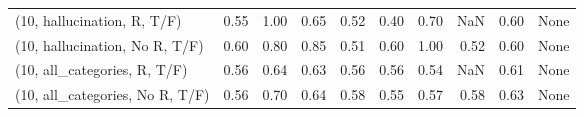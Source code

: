 \begin{table*}[h!]
\begin{adjustbox}{width=2\columnwidth,center}
\begin{tabular}{lrrr|rrr|rrr}
(10, hallucination, R, T/F)           &                      0.55 &                  1.00 &                      0.65 &                          0.52 &                      0.40 &                          0.70 &                                    NaN &                               0.60 &                                  None \\
(10, hallucination, No R, T/F)        &                      0.60 &                  0.80 &                      0.85 &                          0.51 &                      0.60 &                          1.00 &                                   0.52 &                               0.60 &                                  None \\
(10, all\_categories, R, T/F)          &                      0.56 &                  0.64 &                      0.63 &                          0.56 &                      0.56 &                          0.54 &                                    NaN &                               0.61 &                                  None \\
(10, all\_categories, No R, T/F)       &                      0.56 &                  0.70 &                      0.64 &                          0.58 &                      0.55 &                          0.57 &                                   0.58 &                               0.63 &                                  None \\




\end{tabular}
\end{adjustbox}
\end{table*}
